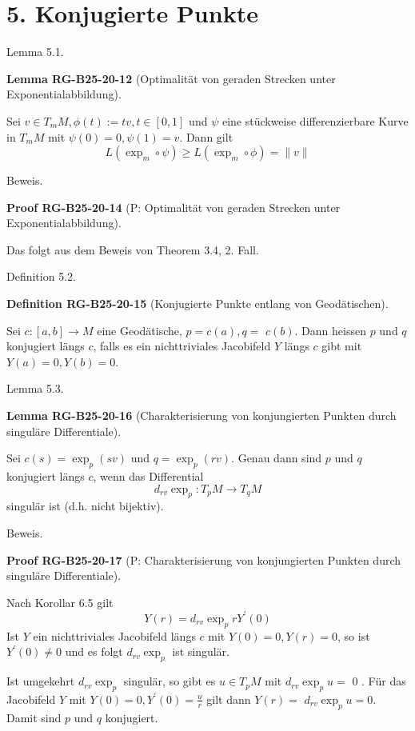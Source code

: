 \documentclass[10pt, letterpaper]{article}
\newcommand{\CustomHeading}[3]{%
  \par\medskip\noindent%
  \textbf{#1 #2} \textnormal{(#3)}.\enskip%
}
\newenvironment{DEF}[2]{\begin{unitbox}\CustomHeading{Definition}{#1}{#2}}{\end{unitbox}}
\newenvironment{LEM}[2]{\begin{unitbox}\CustomHeading{Lemma}{#1}{#2}}{\end{unitbox}}
\newenvironment{PROOF}[2]{\begin{unitbox}\CustomHeading{Proof}{#1}{#2}}{\end{unitbox}}
\begin{document}
\section*{5. Konjugierte Punkte}


Lemma 5.1. 


\begin{LEM}{RG-B25-20-12}{Optimalität von geraden Strecken unter Exponentialabbildung}
Sei $v \in T_{m} M, \phi(t):=t v, t \in[0,1]$ und $\psi$ eine stückweise differenzierbare Kurve in $T_{m} M$ mit $\psi(0)=0, \psi(1)=v$. Dann gilt
$$
L\left(\exp _{m} \circ \psi\right) \geq L\left(\exp _{m} \circ \phi\right)=\|v\|
$$
\end{LEM}

Beweis. 

\begin{PROOF}{RG-B25-20-14}{P: Optimalität von geraden Strecken unter Exponentialabbildung}
Das folgt aus dem Beweis von Theorem 3.4, 2. Fall.
\end{PROOF}


Definition 5.2. 

\begin{DEF}{RG-B25-20-15}{Konjugierte Punkte entlang von Geodätischen}
Sei $c:[a, b] \rightarrow M$ eine Geodätische, $p=c(a), q=$ $c(b)$. Dann heissen $p$ und $q$ konjugiert längs $c$, falls es ein nichttriviales Jacobifeld $Y$ längs $c$ gibt mit $Y(a)=0, Y(b)=0$.
\end{DEF}

Lemma 5.3. 


\begin{LEM}{RG-B25-20-16}{Charakterisierung von konjungierten Punkten durch singuläre Differentiale}
Sei $c(s)=\exp _{p}(s v)$ und $q=\exp _{p}(r v)$. Genau dann sind $p$ und $q$ konjugiert längs $c$, wenn das Differential
$$
d_{r v} \exp _{p}: T_{p} M \rightarrow T_{q} M
$$
singulär ist (d.h. nicht bijektiv).
\end{LEM}


Beweis. 

\begin{PROOF}{RG-B25-20-17}{P: Charakterisierung von konjungierten Punkten durch singuläre Differentiale}
Nach Korollar 6.5 gilt
$$
Y(r)=d_{r v} \exp _{p} r Y^{\prime}(0)
$$
Ist $Y$ ein nichttriviales Jacobifeld längs $c$ mit $Y(0)=0, Y(r)=0$, so ist $Y^{\prime}(0) \neq 0$ und es folgt $d_{r v} \exp _{p}$ ist singulär.

Ist umgekehrt $d_{r v} \exp _{p}$ singulär, so gibt es $u \in T_{p} M$ mit $d_{r v} \exp _{p} u=$ 0 . Für das Jacobifeld $Y$ mit $Y(0)=0, Y^{\prime}(0)=\frac{u}{r}$ gilt dann $Y(r)=$ $d_{r v} \exp _{p} u=0$. Damit sind $p$ und $q$ konjugiert.
\end{PROOF}
\end{document}
